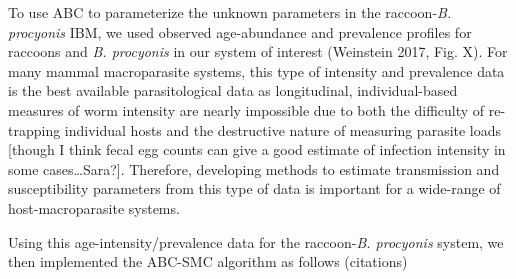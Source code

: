 \documentclass[11pt]{article}
\begin{document}
To use ABC to parameterize the unknown parameters in the
raccoon-\emph{B. procyonis} IBM, we used observed age-abundance and
prevalence profiles for raccoons and \emph{B. procyonis} in our system
of interest (Weinstein 2017, Fig. X). For many mammal macroparasite
systems, this type of intensity and prevalence data is the best
available parasitological data as longitudinal, individual-based
measures of worm intensity are nearly impossible due to both the
difficulty of re-trapping individual hosts and the destructive nature of
measuring parasite loads {[}though I think fecal egg counts can give a
good estimate of infection intensity in some cases\ldots{}Sara?{]}.
Therefore, developing methods to estimate transmission and
susceptibility parameters from this type of data is important for a
wide-range of host-macroparasite systems.

Using this age-intensity/prevalence data for the raccoon-\emph{B.
procyonis} system, we then implemented the ABC-SMC algorithm as follows
(citations)
\end{document}
